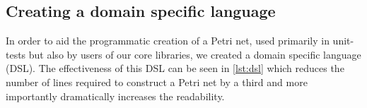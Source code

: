 \subsection{Creating a domain specific language}
In order to aid the programmatic creation of a Petri net, used primarily in unit-tests but also by users of our core libraries, we created a domain specific language (DSL). 
The effectiveness of this DSL can be seen in \cref{lst:dsl} which reduces the number of lines required to construct a Petri net by a third and more importantly dramatically increases the readability.

